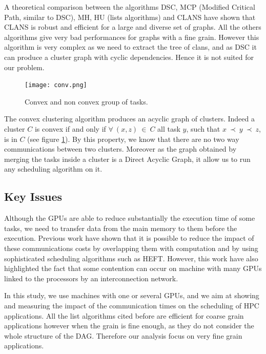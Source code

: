 \documentclass[10pt, conference, compsocconf,pdftex,dvipsnames]{IEEEtran}
\begin{document}
A theoretical comparison\cite{khan1994comparison} between the algorithms DSC,
MCP (Modified Critical Path, similar to DSC), MH, HU (lists algorithms) and
CLANS have shown that CLANS is robust and efficient for a large and diverse
set of graphs. All the others algorithms give very bad performances for graphs
with a fine grain. However this algorithm is very complex as we need to
extract the tree of clans, and as DSC it can produce a cluster graph with
cyclic dependencies. Hence it is not suited for our problem. 

\begin{figure}[htb]
    \centering
    \texttt{[image: conv.png]}
    \caption{Convex and non convex group of tasks.}
    \label{fig:conv}
\end{figure}


The convex clustering algorithm\cite{lepere2002new} produces an acyclic graph
of clusters.  Indeed a cluster $C$ is convex if and only if $\forall\ (x,z)\
\in\ C$ all task $y$, such that $x\ \prec\ y\ \prec\ z$, is in $C$ (see
figure \ref{fig:conv}). By this property, we know that there are no two way
communications between two clusters. Moreover as the graph obtained by merging
the tasks inside a cluster is a Direct Acyclic Graph, it allow us to run
any scheduling algorithm on it.

\subsection{Key Issues}

Although the GPUs are able to reduce substantially the execution time of some
tasks, we need to transfer data from the main memory to them before the
execution. Previous work\cite{ferreiralima:hal-00735470} have shown that it is
possible to reduce the impact of these communications costs by overlapping
them with computation and by using sophisticated scheduling algorithms such as
HEFT.  However, this work have also highlighted the fact that some contention
can occur on machine with many GPUs linked to the processors by an
interconnection network.

In this study, we use machines with one or several GPUs, and we aim at showing
and measuring the impact of the communication times on the scheduling of HPC
applications. All the list algorithms cited before are efficient for coarse
grain applications however when the grain is fine enough, as they do not
consider the whole structure of the DAG. Therefore our analysis focus on very
fine grain applications. 
\end{document}
